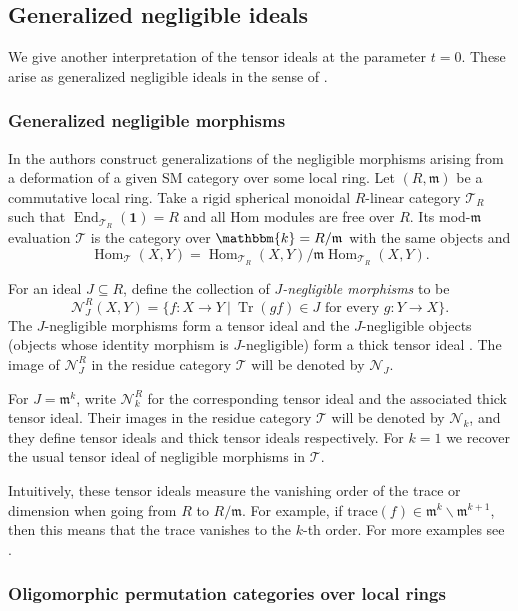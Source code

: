 \documentclass[11pt,a4paper]{amsart}
\theoremstyle{plain}%
\theoremstyle{definition}
\theoremstyle{remark}
\newcommand{\Tr}{\operatorname{Tr}}
\newcommand{\Hom}{\operatorname{Hom}}
\newcommand{\End}{\operatorname{End}}
\newcommand{\kk}{\mathbbm{k}}
\newcommand{\one}{{\mathbf{1}}}
\newcommand{\N}{\mathcal N}
\newcommand{\mfrak}{\mathfrak{m}}
\begin{document}
\subsection{Generalized negligible ideals}\label{sec:higher-negligible}

We give another interpretation of the tensor ideals at the parameter $t=0$. These arise as generalized negligible ideals in the sense of \cite{HW}.

\subsubsection{Generalized negligible morphisms}

In \cite{HW} the authors construct generalizations of the negligible morphisms arising from a deformation of a given SM category over some local ring. Let $(R,\mfrak)$ be a commutative local ring.  Take a rigid spherical monoidal $R$-linear category $\mathcal{T}_R$ such
that $\End_{\mathcal{T}_R}(\one)=R$ and all Hom modules are free over $R$. Its mod-$\mfrak$
evaluation $\mathcal{T}$ is the category over $\kk = R/\mfrak$ with the same objects and
\[
 \Hom_{{\mathcal{T}}}(X,Y)=
 \Hom_{\mathcal{T}_R}(X,Y)/\mfrak\Hom_{\mathcal{T}_R}(X,Y).
\]

For an ideal $J\subseteq R$, define the collection of \emph{$J$-negligible morphisms} to be
\[
 \N^R_J(X,Y)=
 \{f:X\to Y \ | \ \Tr(gf)\in J\text{ for every }g:Y\to X\}.
\]
The $J$-negligible morphisms form a tensor ideal and the $J$-negligible
objects (objects whose identity morphism is $J$-negligible) form a thick tensor ideal \cite[Lemma~2.2]{HW}. The image of $\N^R_J$ in the residue category $\mathcal{T}$ will
be denoted by $\N_J$.

For $J=\mfrak^k$, write $\N^R_k$ for the corresponding tensor ideal and the associated thick tensor ideal. Their images in the residue category $\mathcal{T}$ will
be denoted by $\N_k$, and they define tensor ideals and thick tensor ideals respectively. For $k=1$ we recover the usual tensor ideal of negligible morphisms in $\mathcal{T}$.

Intuitively, these tensor ideals measure the vanishing order of the trace or dimension when going from $R$ to $R/\mfrak$. For example, if $\mathrm{trace}(f) \in \mfrak^k \backslash \mfrak^{k+1}$, then this means that the trace vanishes to the $k$-th order. For more examples see \cite{HW,HW2}.

\subsubsection{Oligomorphic permutation categories over local rings}
\end{document}
